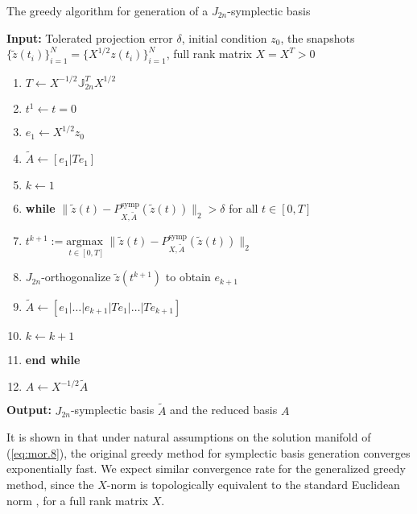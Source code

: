\begin{algorithm} 
\caption{The greedy algorithm for generation of a $J_{2n}$-symplectic basis} \label{alg:2}
{\bf Input:} Tolerated projection error $\delta$, initial condition $ z_0$, the snapshots $\{\tilde z(t_i)\}_{i=1}^{N} = \{X^{1/2} z(t_i)\}_{i=1}^{N}$, full rank matrix $X=X^T>0$
\begin{enumerate}
\item $T \leftarrow X^{-1/2}\mathbb J_{2n}^T X^{1/2}$
\item $t^1 \leftarrow t=0$
\item $e_1 \leftarrow X^{1/2}z_0$
\item $\tilde A \leftarrow [e_1|Te_1]$
\item $k \leftarrow 1$
\item \textbf{while} $\| \tilde z(t) - P^\text{symp}_{X,\tilde A}( \tilde z(t) ) \|_2 > \delta$ for all $t \in [0,T]$
\item \hspace{0.5cm} $t^{k+1} := \underset{t\in [0,T]}{\text{argmax }} \| \tilde z(t) - P^\text{symp}_{X,\tilde A}( \tilde z(t) ) \|_2$
\item \hspace{0.5cm} $J_{2n}$-orthogonalize $ \tilde z(t^{k+1})$ to obtain $e_{k+1}$
\item \hspace{0.5cm} $\tilde A \leftarrow [e_1|\dots |e_{k+1} | Te_1|\dots| Te_{k+1}]$
\item \hspace{0.5cm} $k \leftarrow k+1$
\item \textbf{end while}
\item $A\leftarrow X^{-1/2} \tilde A$
\end{enumerate}
\vspace{0.5cm}
{\bf Output:} $J_{2n}$-symplectic basis $\tilde A$ and the reduced basis $A$
\end{algorithm}

It is shown in \cite{doi:10.1137/17M1111991} that under natural assumptions on the solution manifold of (\ref{eq:mor.8}), the original greedy method for symplectic basis generation converges exponentially fast. We expect similar convergence rate for the generalized greedy method, since the $X$-norm is topologically equivalent to the standard Euclidean norm \cite{friedman1970foundations}, for a full rank matrix $X$.

